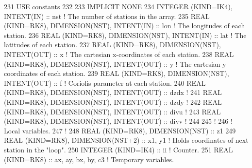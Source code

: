 \begin{DoxyCode}
231 \textcolor{keywordtype}{USE }\hyperlink{namespaceconstants}{constants}
232 
233 \textcolor{keywordtype}{IMPLICIT NONE}
234 \textcolor{keywordtype}{INTEGER (KIND=IK4)}, \textcolor{keywordtype}{INTENT(IN)}                :: nst          \textcolor{comment}{! The number of stations in the array.}
235 \textcolor{keywordtype}{REAL (KIND=RK8)}, \textcolor{keywordtype}{DIMENSION(NST)}, \textcolor{keywordtype}{INTENT(IN)}   :: lon          \textcolor{comment}{! The longitudes of each station.}
236 \textcolor{keywordtype}{REAL (KIND=RK8)}, \textcolor{keywordtype}{DIMENSION(NST)}, \textcolor{keywordtype}{INTENT(IN)}   :: lat          \textcolor{comment}{! The latitudes of each station.}
237 \textcolor{keywordtype}{REAL (KIND=RK8)}, \textcolor{keywordtype}{DIMENSION(NST)}, \textcolor{keywordtype}{INTENT(OUT)}  :: x            \textcolor{comment}{! The cartesian x-coordinates of each
       station.}
238 \textcolor{keywordtype}{REAL (KIND=RK8)}, \textcolor{keywordtype}{DIMENSION(NST)}, \textcolor{keywordtype}{INTENT(OUT)}  :: y            \textcolor{comment}{! The cartesian y-coordinates of each
       station.}
239 \textcolor{keywordtype}{REAL (KIND=RK8)}, \textcolor{keywordtype}{DIMENSION(NST)}, \textcolor{keywordtype}{INTENT(OUT)}  :: f            \textcolor{comment}{! Coriolis parameter at each station.}
240 \textcolor{keywordtype}{REAL (KIND=RK8)}, \textcolor{keywordtype}{DIMENSION(NST)}, \textcolor{keywordtype}{INTENT(OUT)}  :: dzdx         \textcolor{comment}{!}
241 \textcolor{keywordtype}{REAL (KIND=RK8)}, \textcolor{keywordtype}{DIMENSION(NST)}, \textcolor{keywordtype}{INTENT(OUT)}  :: dzdy         \textcolor{comment}{!}
242 \textcolor{keywordtype}{REAL (KIND=RK8)}, \textcolor{keywordtype}{DIMENSION(NST)}, \textcolor{keywordtype}{INTENT(OUT)}  :: divu         \textcolor{comment}{!}
243 \textcolor{keywordtype}{REAL (KIND=RK8)}, \textcolor{keywordtype}{DIMENSION(NST)}, \textcolor{keywordtype}{INTENT(OUT)}  :: divv         \textcolor{comment}{!}
244 
245 \textcolor{comment}{!}
246 \textcolor{comment}{! Local variables.}
247 \textcolor{comment}{!}
248 \textcolor{keywordtype}{REAL (KIND=RK8)}, \textcolor{keywordtype}{DIMENSION(NST)}               :: z1
249 \textcolor{keywordtype}{REAL (KIND=RK8)}, \textcolor{keywordtype}{DIMENSION(NST+2)}             :: x1, y1               \textcolor{comment}{! Holds coordinates of next station
       in the "loop".}
250 \textcolor{keywordtype}{INTEGER (KIND=IK4)}                            :: ii                   \textcolor{comment}{! Counter.}
251 \textcolor{keywordtype}{REAL (KIND=RK8)}                               :: ax, ay, bx, by, c3   \textcolor{comment}{! Temporary variables.}

\end{DoxyCode}
